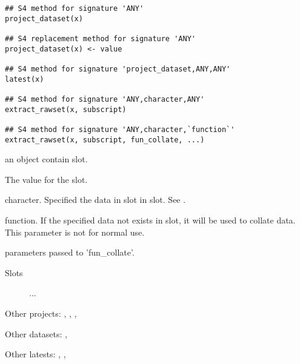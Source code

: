 \documentclass[letterpaper]{book}
\begin{document}
%
\begin{Usage}
\begin{verbatim}
## S4 method for signature 'ANY'
project_dataset(x)

## S4 replacement method for signature 'ANY'
project_dataset(x) <- value

## S4 method for signature 'project_dataset,ANY,ANY'
latest(x)

## S4 method for signature 'ANY,character,ANY'
extract_rawset(x, subscript)

## S4 method for signature 'ANY,character,`function`'
extract_rawset(x, subscript, fun_collate, ...)
\end{verbatim}
\end{Usage}
%
\begin{Arguments}
\begin{ldescription}
\item[\code{x}] an object contain  slot.

\item[\code{value}] The value for the slot.

\item[\code{subscript}] character. Specified the data in  slot
in  slot.
See .

\item[\code{fun\_collate}] function. If the specified data not exists in  slot,
it will be used to collate data. This parameter is not for normal use.

\item[\code{...}] parameters passed to 'fun\_collate'.
\end{ldescription}
\end{Arguments}
%
\begin{Section}{Slots}

\begin{description}

\item[] ...

\end{description}
\end{Section}
%
\begin{SeeAlso}\relax
{}


Other projects: 
,
,
,

Other datasets: 
,

Other latests: 
,
,
\end{SeeAlso}
\end{document}
